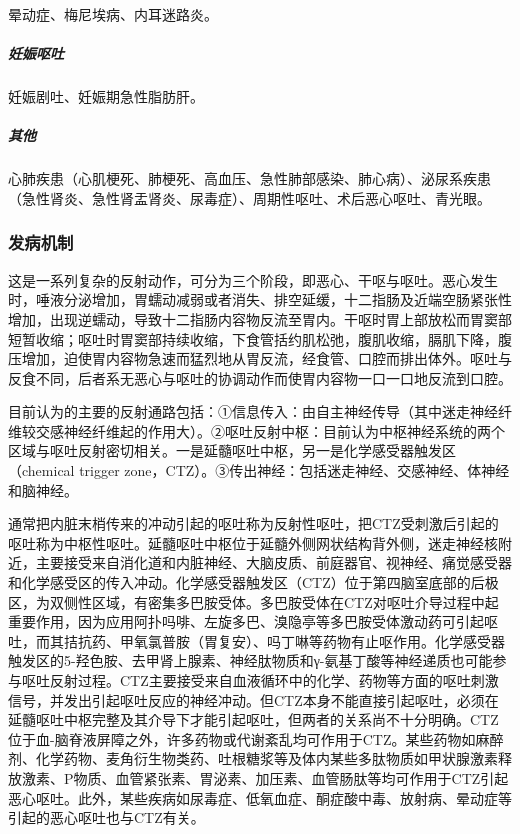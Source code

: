 晕动症、梅尼埃病、内耳迷路炎。

\subparagraph{妊娠呕吐}

妊娠剧吐、妊娠期急性脂肪肝。

\subparagraph{其他}

心肺疾患（心肌梗死、肺梗死、高血压、急性肺部感染、肺心病）、泌尿系疾患（急性肾炎、急性肾盂肾炎、尿毒症）、周期性呕吐、术后恶心呕吐、青光眼。

\subsubsection{发病机制}

这是一系列复杂的反射动作，可分为三个阶段，即恶心、干呕与呕吐。恶心发生时，唾液分泌增加，胃蠕动减弱或者消失、排空延缓，十二指肠及近端空肠紧张性增加，出现逆蠕动，导致十二指肠内容物反流至胃内。干呕时胃上部放松而胃窦部短暂收缩；呕吐时胃窦部持续收缩，下食管括约肌松弛，腹肌收缩，膈肌下降，腹压增加，迫使胃内容物急速而猛烈地从胃反流，经食管、口腔而排出体外。呕吐与反食不同，后者系无恶心与呕吐的协调动作而使胃内容物一口一口地反流到口腔。

目前认为的主要的反射通路包括：①信息传入：由自主神经传导（其中迷走神经纤维较交感神经纤维起的作用大）。②呕吐反射中枢：目前认为中枢神经系统的两个区域与呕吐反射密切相关。一是延髓呕吐中枢，另一是化学感受器触发区（chemical
trigger zone，CTZ）。③传出神经：包括迷走神经、交感神经、体神经和脑神经。

通常把内脏末梢传来的冲动引起的呕吐称为反射性呕吐，把CTZ受刺激后引起的呕吐称为中枢性呕吐。延髓呕吐中枢位于延髓外侧网状结构背外侧，迷走神经核附近，主要接受来自消化道和内脏神经、大脑皮质、前庭器官、视神经、痛觉感受器和化学感受区的传入冲动。化学感受器触发区（CTZ）位于第四脑室底部的后极区，为双侧性区域，有密集多巴胺受体。多巴胺受体在CTZ对呕吐介导过程中起重要作用，因为应用阿扑吗啡、左旋多巴、溴隐亭等多巴胺受体激动药可引起呕吐，而其拮抗药、甲氧氯普胺（胃复安）、吗丁啉等药物有止呕作用。化学感受器触发区的5-羟色胺、去甲肾上腺素、神经肽物质和γ-氨基丁酸等神经递质也可能参与呕吐反射过程。CTZ主要接受来自血液循环中的化学、药物等方面的呕吐刺激信号，并发出引起呕吐反应的神经冲动。但CTZ本身不能直接引起呕吐，必须在延髓呕吐中枢完整及其介导下才能引起呕吐，但两者的关系尚不十分明确。CTZ位于血-脑脊液屏障之外，许多药物或代谢紊乱均可作用于CTZ。某些药物如麻醉剂、化学药物、麦角衍生物类药、吐根糖浆等及体内某些多肽物质如甲状腺激素释放激素、P物质、血管紧张素、胃泌素、加压素、血管肠肽等均可作用于CTZ引起恶心呕吐。此外，某些疾病如尿毒症、低氧血症、酮症酸中毒、放射病、晕动症等引起的恶心呕吐也与CTZ有关。

